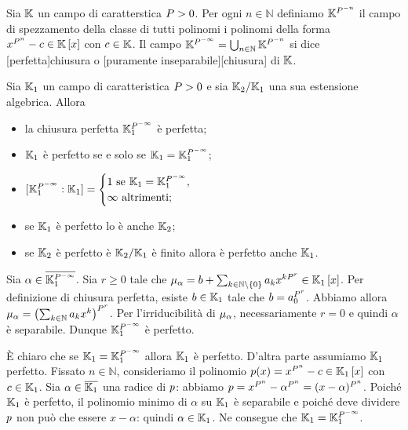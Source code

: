 \begin{Definition}
	Sia $\mathbb{K}$ un campo di caratterstica $P > 0$. Per ogni $n \in \mathbb{N}$ definiamo $\mathbb{K}^{P^{-n}}$ il campo di spezzamento della classe di tutti polinomi i polinomi della forma $x^{P^{n}} - c \in \mathbb{K} \left [ x \right ]$ con $c \in \mathbb{K}$. Il campo $\PerfectClosure{\Field} = \bigcup_{n \in \mathbb{N}} \Field^{\Prime^{-n}}$ si dice [perfetta]{chiusura} o [puramente inseparabile][chiusura] di $\mathbb{K}$.
\end{Definition}
\begin{Theorem}
	Sia $\mathbb{K}_1$ un campo di caratteristica $P > 0$ e sia $\mathbb{K}_2/\mathbb{K}_1$ una sua estensione algebrica. Allora
	\begin{itemize}
		\item la chiusura perfetta $\PerfectClosure{\Field_1}$ \`e perfetta;
		\item $\mathbb{K}_1$ \`e perfetto se e solo se $\Field_1 = \PerfectClosure{\Field_1}$;
		\item $\FieldDegree{\PerfectClosure{\Field_1}}{\Field_1} = \begin{cases} 1\text{ se }\Field_1 = \PerfectClosure{\Field_1},\\\infty\text{ altrimenti;} \end{cases}$
		\item se $\mathbb{K}_1$ \`e perfetto lo \`e anche $\mathbb{K}_2$;
		\item se $\mathbb{K}_2$ \`e perfetto \`e $\mathbb{K}_2/\mathbb{K}_1$ \`e finito allora \`e perfetto anche $\mathbb{K}_1$.
	\end{itemize}
\end{Theorem}
\Proof Sia $\alpha \in \AlgebraicClosure{\PerfectClosure{\Field_1}}$. Sia $r \geq 0$ tale che $\MinimalPolynomial{\alpha} = b + \sum_{k \in \NotZero{\mathbb{N}}} a_k x^{k{\Prime^r}} \in \RingAdjunction{\Field_1}{x}$. Per definizione di chiusura perfetta, esiste $b \in \mathbb{K}_1$ tale che $b = a_0^{P^r}$. Abbiamo allora $\MinimalPolynomial{\alpha} = \left ( \sum_{k \in \mathbb{N}} a_k x^k \right )^{\Prime^r}$. Per l'irriducibilit\`a di $\MinimalPolynomial{\alpha}$, necessariamente $r = 0$ e quindi $\alpha$ \`e separabile. Dunque $\PerfectClosure{\Field_1}$ \`e perfetto.
\par \`E chiaro che se $\Field_1 = \PerfectClosure{\Field_1}$ allora $\mathbb{K}_1$ \`e perfetto. D'altra parte assumiamo $\mathbb{K}_1$ perfetto. Fissato $n \in \mathbb{N}$, consideriamo il polinomio $p(x) = x^{P^n} - c \in \mathbb{K}_1 \left [ x \right ]$ con $c \in \mathbb{K}_1$. Sia $\alpha \in \overline{\mathbb{K}_1}$ una radice di $p$: abbiamo $p = x^{P^n} - \alpha^{P^n} = (x - \alpha)^{P^n}$. Poich\'e $\mathbb{K}_1$ \`e perfetto, il polinomio minimo di $\alpha$ su $\mathbb{K}_1$ \`e separabile e poich\'e deve dividere $p$ non pu\`o che essere $x - \alpha$: quindi $\alpha \in \mathbb{K}_1$. Ne consegue che $\Field_1 = \PerfectClosure{\Field_1}$.
